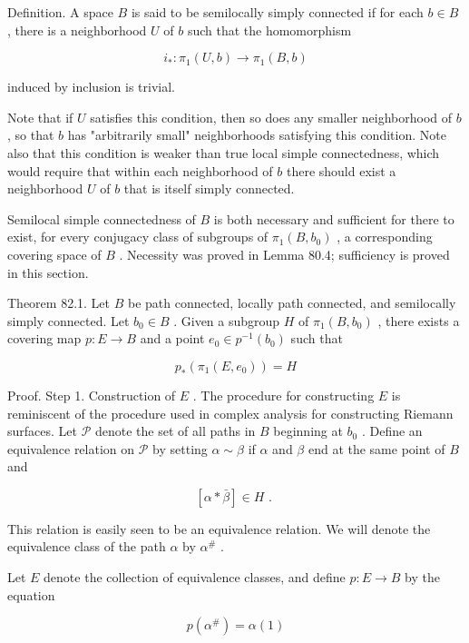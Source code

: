 Definition. A space \(B\) is said to be semilocally simply connected if for each \(b \in  B\) , there is a neighborhood \(U\) of \(b\) such that the homomorphism

\[
{i}_{ * } : {\pi }_{1}\left( {U,b}\right)  \rightarrow  {\pi }_{1}\left( {B,b}\right)
\]

induced by inclusion is trivial.

Note that if \(U\) satisfies this condition, then so does any smaller neighborhood of \(b\) , so that \(b\) has "arbitrarily small" neighborhoods satisfying this condition. Note also that this condition is weaker than true local simple connectedness, which would require that within each neighborhood of \(b\) there should exist a neighborhood \(U\) of \(b\) that is itself simply connected.

Semilocal simple connectedness of \(B\) is both necessary and sufficient for there to exist, for every conjugacy class of subgroups of \({\pi }_{1}\left( {B,{b}_{0}}\right)\) , a corresponding covering space of \(B\) . Necessity was proved in Lemma 80.4; sufficiency is proved in this section.

Theorem 82.1. Let \(B\) be path connected, locally path connected, and semilocally simply connected. Let \({b}_{0} \in  B\) . Given a subgroup \(H\) of \({\pi }_{1}\left( {B,{b}_{0}}\right)\) , there exists a covering map \(p : E \rightarrow  B\) and a point \({e}_{0} \in  {p}^{-1}\left( {b}_{0}\right)\) such that

\[
{p}_{ * }\left( {{\pi }_{1}\left( {E,{e}_{0}}\right) }\right)  = H
\]

Proof. Step 1. Construction of \(E\) . The procedure for constructing \(E\) is reminiscent of the procedure used in complex analysis for constructing Riemann surfaces. Let \(\mathcal{P}\) denote the set of all paths in \(B\) beginning at \({b}_{0}\) . Define an equivalence relation on \(\mathcal{P}\) by setting \(\alpha  \sim  \beta\) if \(\alpha\) and \(\beta\) end at the same point of \(B\) and

\[
\left\lbrack  {\alpha  * \bar{\beta }}\right\rbrack   \in  H\text{ . }
\]

This relation is easily seen to be an equivalence relation. We will denote the equivalence class of the path \(\alpha\) by \({\alpha }^{\# }\) .

Let \(E\) denote the collection of equivalence classes, and define \(p : E \rightarrow  B\) by the equation

\[
p\left( {\alpha }^{\# }\right)  = \alpha \left( 1\right)
\]

